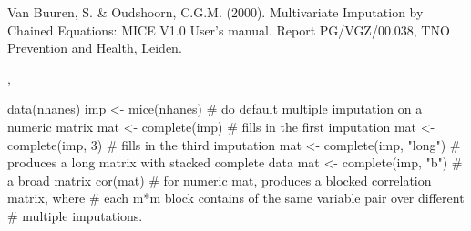\begin{References}\relax
Van Buuren, S. \& Oudshoorn, C.G.M. (2000). Multivariate Imputation by Chained Equations: 
MICE V1.0 User's manual. Report PG/VGZ/00.038, TNO Prevention and Health, Leiden.
\end{References}
\begin{SeeAlso}\relax
{}, 
\end{SeeAlso}
\begin{Examples}
\begin{ExampleCode}
data(nhanes)
imp <- mice(nhanes)     # do default multiple imputation on a numeric matrix
mat <- complete(imp)    # fills in the first imputation
mat <- complete(imp, 3) # fills in the third imputation
mat <- complete(imp, "long") # produces a long matrix with stacked complete data
mat <- complete(imp, "b") # a broad matrix
cor(mat)                # for numeric mat, produces a blocked correlation matrix, where
            # each m*m block contains of the same variable pair over different
            # multiple imputations.
\end{ExampleCode}
\end{Examples}

